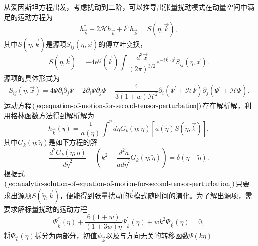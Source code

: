 从爱因斯坦方程出发，考虑扰动到二阶，可以推导出张量扰动模式在动量空间中满足的运动方程为
\begin{equation}
  \label{eq:equation-of-motion-for-second-tensor-perturbation}
  h^{\dprime}_{\vec{k}} +
  2\mathcal{H}h^{\prime}_{\vec{k}}+k^2h_{\vec{k}}=S(\eta,\vec{k}),
\end{equation}
其中$S(\eta,\vec{k})$是源项$S_{ij}(\eta,\vec{x})$的傅立叶变换，
\begin{equation}
  \label{eq:source-term-in-fourier-space}
  S(\eta, \vec{k}) = -4\mathrm{e}^{ij}(\vec{k}) \int
  \frac{d^3 \vec{x}}{{\left(2\pi \right)}^{3 /2}} e^{-i \vec{k}\cdot \vec{x}}
  S_{ij}(\eta, \vec{x}).
\end{equation}
源项的具体形式为\citep{ananda2007cosmological,baumann2007gravitational}
\begin{equation}
  \label{eq:source-term-in-real-space}
  S_{ij}(\eta, \vec{x}) = 
  4\Psi \partial_{i} \partial_{j} \Psi + 2\partial_{i} \Psi\partial_{j}
  \Psi - \frac{4}{3(1+w)\mathcal{H}^2}\partial_{i}
  (\Psi^\prime+\mathcal{H}\Psi)\partial_{j} (\Psi^\prime+\mathcal{H}\Psi). 
\end{equation}
运动方程$(\ref{eq:equation-of-motion-for-second-tensor-perturbation})$存在解析解，利用格林函数方法得到解析解为
\begin{equation}
  \label{eq:analytic-solution-of-equation-of-motion-for-second-tensor-perturbation} 
  h_{\vec{k}}(\eta)=\frac{1}{a(\eta)} \int^{\eta} d
  \tilde{\eta}G_{k}(\eta;\tilde{\eta}) \left[
  a(\tilde{\eta})S(\tilde{\eta}, \vec{k}) \right] ,
\end{equation}
其中$G_{k}(\eta;\tilde{\eta})$是如下方程的解
\begin{equation}
  \frac{d^2G_{k}(\eta;\tilde{\eta})}{d \tilde{\eta}^2} + \left(
  k^2-\frac{d^2 a}{ad \tilde{\eta}^2} G_{k}(\eta;\tilde{\eta}) \right) 
 = \delta(\eta-\tilde{\eta}).
\end{equation}
根据式$(\ref{eq:analytic-solution-of-equation-of-motion-for-second-tensor-perturbation})$只要求出源项$S(\tilde{\eta},
\vec{k})$，便能得到张量扰动的$\vec{k}$模式随时间的演化。为了解出源项，需要求解标量扰动的运动方程\citep{kodama1984cosmological,mukhanov1992theory}
\begin{equation}
  \label{eq:equation-for-scalar-perturbation}
  \Psi^{\dprime}_{\vec{k}}(\eta) +
  \frac{6(1+w)}{(1+3w)\eta}\Psi^\prime_{\vec{k}}(\eta) +
  wk^2\Psi_{\vec{k}}(\eta) = 0, 
\end{equation}
将$\Psi_{\vec{k}}(\eta)$拆分为两部分，初值$\psi_{\vec{k}}$以及与方向无关的转移函数$\Psi(k\eta)$
